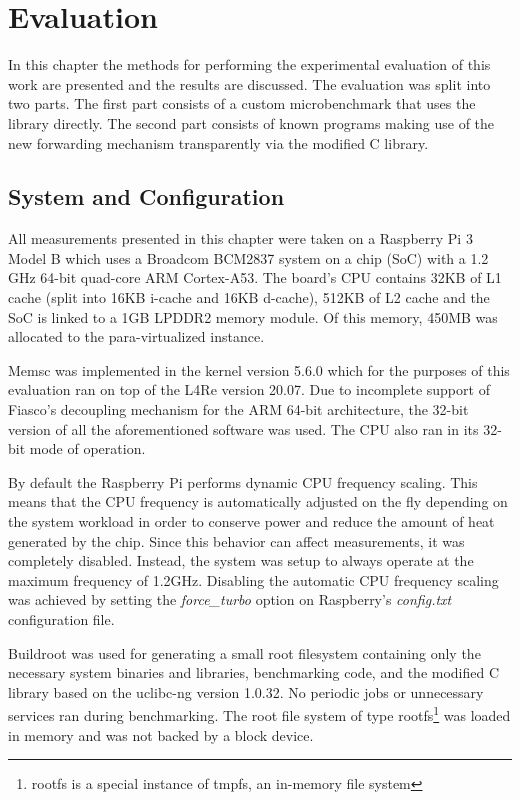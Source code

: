 \chapter{Evaluation}
\label{chap:evaluation}

In this chapter the methods for performing the experimental evaluation of this
work are presented and the results are discussed. The evaluation was split into
two parts. The first part consists of a custom microbenchmark that uses the
\lib library directly. The second part consists of known programs making use of
the new forwarding mechanism transparently via the modified C library.

\section{System and Configuration}

All measurements presented in this chapter were taken on a Raspberry Pi 3 Model
B which uses a Broadcom BCM2837 system on a chip (SoC) with a 1.2 GHz 64-bit
quad-core ARM Cortex-A53. The board's CPU contains 32KB of L1 cache (split into
16KB i-cache and 16KB d-cache), 512KB of L2 cache and the SoC is linked to a
1GB LPDDR2 memory module. Of this memory, 450MB was allocated to the
para-virtualized \llinux instance.

Memsc was implemented in the \llinux kernel version 5.6.0 which for the
purposes of this evaluation ran on top of the L4Re version 20.07. Due to
incomplete support of Fiasco's decoupling mechanism for the ARM 64-bit
architecture, the 32-bit version of all the aforementioned software was used.
The CPU also ran in its 32-bit mode of operation.

By default the Raspberry Pi performs dynamic CPU frequency scaling. This means
that the CPU frequency is automatically adjusted on the fly depending on the
system workload in order to conserve power and reduce the amount of heat
generated by the chip. Since this behavior can affect measurements, it was
completely disabled. Instead, the system was setup to always operate at the
maximum frequency of 1.2GHz. Disabling the automatic CPU frequency scaling was
achieved by setting the \emph{force\_turbo} option on Raspberry's
\emph{config.txt} configuration file.

Buildroot \cite{buildroot} was used for generating a small root filesystem
containing only the necessary system binaries and libraries, benchmarking code,
and the modified C library based on the uclibc-ng version 1.0.32. No periodic
jobs or unnecessary services ran during benchmarking. The root file system of
type rootfs\footnote{rootfs is a special instance of tmpfs, an in-memory file
system} was loaded in memory and was not backed by a block device.

